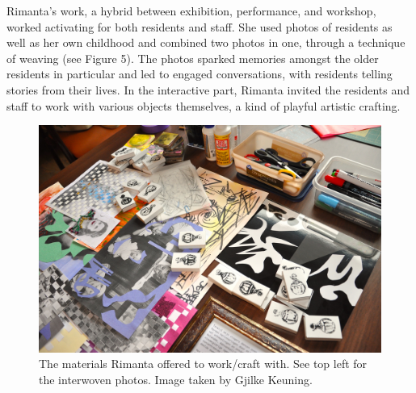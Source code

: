 \documentclass[authordate, empirical]{jote-new-article}
\begin{document}
	Rimanta's work, a hybrid between exhibition, performance, and workshop, worked activating for both residents and staff. She used photos of residents as well as her own childhood and combined two photos in one, through a technique of weaving (see Figure 5). The photos sparked memories amongst the older residents in particular and led to engaged conversations, with residents telling stories from their lives. In the interactive part, Rimanta invited the residents and staff to work with various objects themselves, a kind of playful artistic crafting.







	\begin{figure}
		\includegraphics[width=\linewidth]{media/fig+5.jpeg}

		\caption{The materials Rimanta offered to work/craft with. See top left for the interwoven photos. Image taken by Gjilke Keuning.}



	\end{figure}
\end{document}
